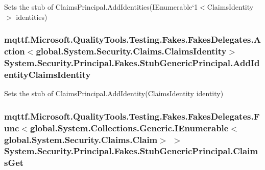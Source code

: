 Sets the stub of Claims\-Principal.\-Add\-Identities(I\-Enumerable`1$<$Claims\-Identity$>$ identities)

\hypertarget{class_system_1_1_security_1_1_principal_1_1_fakes_1_1_stub_generic_principal_ad9766ac4857ed377535703e4f771c3d0}{
\subsubsection[{Add\-Identity\-Claims\-Identity}]{\setlength{\rightskip}{0pt plus 5cm}mqttf.\-Microsoft.\-Quality\-Tools.\-Testing.\-Fakes.\-Fakes\-Delegates.\-Action$<$global.\-System.\-Security.\-Claims.\-Claims\-Identity$>$ System.\-Security.\-Principal.\-Fakes.\-Stub\-Generic\-Principal.\-Add\-Identity\-Claims\-Identity}}\label{class_system_1_1_security_1_1_principal_1_1_fakes_1_1_stub_generic_principal_ad9766ac4857ed377535703e4f771c3d0}


Sets the stub of Claims\-Principal.\-Add\-Identity(\-Claims\-Identity identity)

\hypertarget{class_system_1_1_security_1_1_principal_1_1_fakes_1_1_stub_generic_principal_a1140f10a8bdb673109699319bf6280f9}{
\subsubsection[{Claims\-Get}]{\setlength{\rightskip}{0pt plus 5cm}mqttf.\-Microsoft.\-Quality\-Tools.\-Testing.\-Fakes.\-Fakes\-Delegates.\-Func$<$global.\-System.\-Collections.\-Generic.\-I\-Enumerable$<$global.\-System.\-Security.\-Claims.\-Claim$>$ $>$ System.\-Security.\-Principal.\-Fakes.\-Stub\-Generic\-Principal.\-Claims\-Get}}\label{class_system_1_1_security_1_1_principal_1_1_fakes_1_1_stub_generic_principal_a1140f10a8bdb673109699319bf6280f9}


